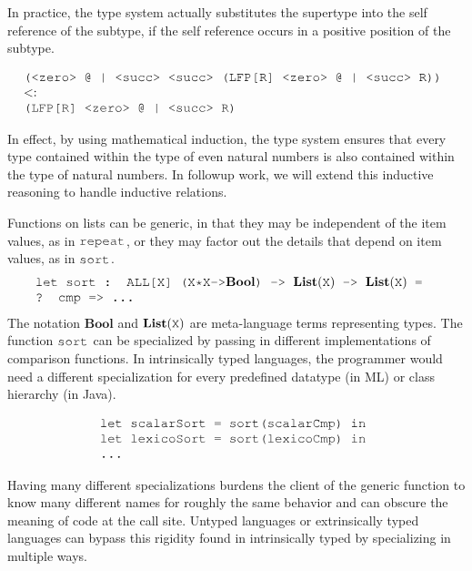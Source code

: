 \documentclass[acmsmall]{acmart}
\theoremstyle{definition}
\begin{document}
\noindent
In practice, the type system actually substitutes the supertype into
the self reference of the subtype, if the self reference occurs in a positive position of the subtype.

\[
  \begin{array}[t]{@{} l}
    \J{(<zero> @ | <succ> <succ> (LFP[R] <zero> @ | <succ> R))} 
    \\
    \subtypes 
    \\
    \J{(LFP[R] <zero> @ | <succ> R)}
  \end{array}
\]

\noindent
In effect, by using mathematical induction, the type system ensures that 
every type contained within the type of even natural numbers is also
contained within the type of natural numbers.
In followup work, we will extend this inductive reasoning to handle inductive relations. 

Functions on lists can be generic, in that they may be independent of the item values, as in $\J{repeat}$,
or they may factor out the details that depend on item values, as in $\J{sort}$. 
\[
  \begin{array}[t]{@{} l}
    \J{let sort : ALL[X] (X*X->} \textbf{Bool} \J{) -> }\textbf{List}(\J{X}) \J{ -> } \textbf{List}(\J{X}) \J{ = }
    \\
    \J{? cmp => ...}
  \end{array}
\]
\noindent
The notation $\textbf{Bool}$ and $\textbf{List}(\J{X})$ are meta-language terms representing types.
The function $\J{sort}$ can be specialized by passing in different implementations of comparison functions.
In intrinsically typed languages, the programmer would need a different specialization for every predefined
datatype (in ML) or class hierarchy (in Java). 

\[
  \begin{array}[t]{@{} l}
    \J{let scalarSort = sort(scalarCmp) in}
    \\
    \J{let lexicoSort = sort(lexicoCmp) in} 
    \\
    \J{...} 
  \end{array}
\]

\noindent
Having many different specializations burdens the client of
the generic function to know many different names for roughly the same behavior and can obscure the meaning
of code at the call site. 
Untyped languages or extrinsically typed languages can bypass this rigidity found in intrinsically typed by specializing in multiple ways.
\end{document}

